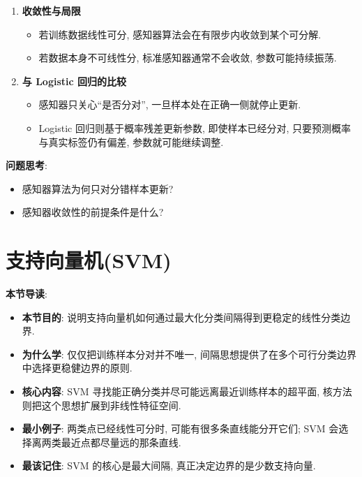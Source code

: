 \documentclass{../nndlcourse}
\begin{document}
\begin{enumerate}
\begin{itemize}
\begin{equation*}
            = y\bigl(\boldsymbol{w}_t^\top \boldsymbol{x}\bigr) + y^2 \boldsymbol{x}^\top \boldsymbol{x},
        \end{equation*}
        其中第二项恒非负, 因而该样本的分类裕度会朝正确方向增大.
    \end{itemize}
    \item \textbf{收敛性与局限}
    \begin{itemize}
        \item 若训练数据线性可分, 感知器算法会在有限步内收敛到某个可分解.
        \item 若数据本身不可线性分, 标准感知器通常不会收敛, 参数可能持续振荡.
    \end{itemize}
    \item \textbf{与 Logistic 回归的比较}
    \begin{itemize}
        \item 感知器只关心“是否分对”, 一旦样本处在正确一侧就停止更新.
        \item Logistic 回归则基于概率残差更新参数, 即使样本已经分对, 只要预测概率与真实标签仍有偏差, 参数就可能继续调整.
    \end{itemize}
\end{enumerate}

\textbf{问题思考}:
\begin{itemize}
    \item 感知器算法为何只对分错样本更新?
    \item 感知器收敛性的前提条件是什么?
\end{itemize}

\section{支持向量机(SVM)}
\textbf{本节导读}:
\begin{itemize}
    \item \textbf{本节目的}: 说明支持向量机如何通过最大化分类间隔得到更稳定的线性分类边界.
    \item \textbf{为什么学}: 仅仅把训练样本分对并不唯一, 间隔思想提供了在多个可行分类边界中选择更稳健边界的原则.
    \item \textbf{核心内容}: SVM 寻找能正确分类并尽可能远离最近训练样本的超平面, 核方法则把这个思想扩展到非线性特征空间.
    \item \textbf{最小例子}: 两类点已经线性可分时, 可能有很多条直线能分开它们; SVM 会选择离两类最近点都尽量远的那条直线.
    \item \textbf{最该记住}: SVM 的核心是最大间隔, 真正决定边界的是少数支持向量.
\end{itemize}
\end{document}
